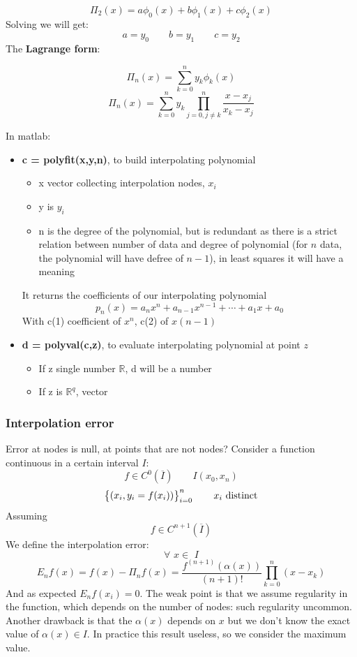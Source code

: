     $$
    \Pi_2(x)=a\phi_0(x)+b\phi_1(x)+c\phi_2(x)
    $$
    Solving we will get:
    $$
    a=y_0\qquad b=y_1\qquad c=y_2
    $$
    The \textbf{Lagrange form}:
    \begin{LARGE}
        $$
        \Pi_n(x)=\sum_{k=0}^ny_k\phi_k(x)
        $$
        $$
        \Pi_n(x)=\sum_{k=0}^ny_k\prod_{j=0,j\neq k}^n
        \frac{
            x-x_j
        }{
            x_k-x_j
        }
        $$
    \end{LARGE}
    In matlab:
    \begin{itemize}
        \item \textbf{c = polyfit(x,y,n)}, to build interpolating polynomial
        \begin{itemize}
            \item x vector collecting interpolation nodes, $x_i$
            \item y is $y_i$
            \item n is the degree of the polynomial, but is redundant as there is a strict relation between number of data and degree of polynomial (for $n$ data, the polynomial will have defree of $n-1$), in least squares it will have a meaning
        \end{itemize}
        It returns the coefficients of our interpolating polynomial
        $$
        p_n(x)=a_nx^n+a_{n-1}x^{n-1}+\cdots+a_1x+a_0
        $$
        With c(1) coefficient of $x^n$, c(2) of $x(n-1)$
        \item \textbf{d = polyval(c,z)}, to evaluate interpolating polynomial at point $z$
        \begin{itemize}
            \item If z single number $\mathbb{R}$, d will be a number
            \item If z is $\mathbb{R}^q$, vector
        \end{itemize}
    \end{itemize}

    \subsubsection{Interpolation error}
    Error at nodes is null, at points that are not nodes? Consider a function continuous in a certain interval $I$:
    $$
    f\in C^0(\overline{I})\qquad I (x_0,x_n)
    $$
    $$
    \begin{Bmatrix} {(x_i,y_i=f(x_i))} \end{Bmatrix}^n_{i=0}\qquad x_i\text{ distinct}
    $$
    Assuming
    $$
    f\in C^{n+1}(\overline{I})
    $$
    We define the interpolation error:
    $$
    \forall\,\,x\in\,\,I
    $$
    $$
    E_nf(x)=f(x)-\Pi_nf(x)=\frac{
        f^{(n+1)}\left(\alpha(x)\right)
    }{
        (n+1)!
    }\prod_{k=0}^n (x-x_k)
    $$
    And as expected $E_nf(x_i)=0$. The weak point is that we assume regularity in the function, which depends on the number of nodes: such regularity uncommon. Another drawback is that the $\alpha(x)$ depends on $x$ but we don't know the exact value of $\alpha(x)\in I$. In practice this result useless, so we consider the maximum value.

